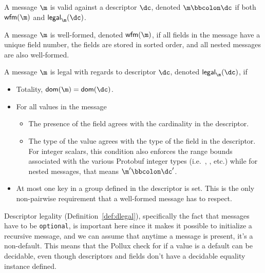 \vspace{1em}
\begin{definition}\label{def:vvalid}
  A message $\m$ is valid against a descriptor $\dc$, denoted $\validv{\m}{\dc}$ if
  both $\wfm{\m}$ and $\legalv{\m}{\dc}$.
\end{definition}

\vspace{1em}
\begin{definition}\label{def:vwf}
  A message $\m$ is well-formed, denoted $\wfm{\m}$, if all fields in
  the message have a unique field number, the fields are stored in sorted
  order, and all nested messages are also well-formed.
\end{definition}

\vspace{1em}
\begin{definition}\label{def:vlegal}
  A message $\m$ is legal with regards to descriptor $\dc$, denoted $\legalv{\m}{\dc}$, if
  \begin{itemize}
  \item Totality, $\dom{\m} = \dom{\dc}$.
  \item For all values in the message
    \begin{itemize}
    \item The presence of the field agrees with the cardinality in the
      descriptor.
    \item The type of the value agrees with the type of the field in the
      descriptor. For integer scalars, this condition also enforces the range
      bounds associated with the various Protobuf integer types (i.e.\ \ints{},
      \uintl{}, etc.) while for nested messages, that means $\validv{\m'}{\dc'}$.
    \end{itemize}
  \item At most one key in a \Oneof{} group defined in the descriptor is
    set. This is the only non-pairwise requirement that a well-formed message has
    to respect.
  \end{itemize}
\end{definition}

Descriptor legality (Definition~\ref{def:dlegal}), specifically the fact that
messages have to be \texttt{optional}, is important here since it makes it
possible to initialize a recursive message, and we can assume that anytime a
message is present, it's a non-default. This means that the Pollux check for if
a value is a default can be decidable, even though descriptors and fields don't
have a decidable equality instance defined.

